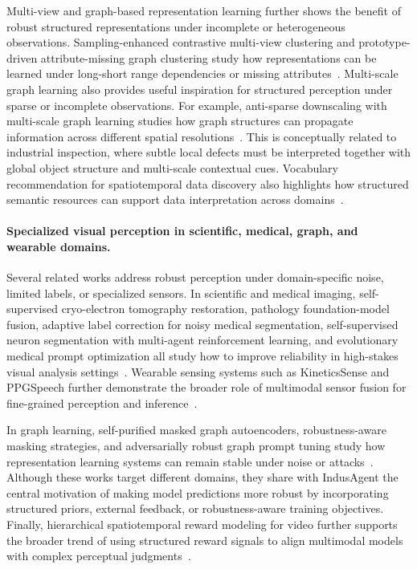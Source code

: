 \documentclass{article}
\begin{document}
{Multi-view and graph-based representation learning further shows the benefit of robust structured representations under incomplete or heterogeneous observations. Sampling-enhanced contrastive multi-view clustering and prototype-driven attribute-missing graph clustering study how representations can be learned under long-short range dependencies or missing attributes~\citep{SEC-LSRM, PAGC}. Multi-scale graph learning also provides useful inspiration for structured perception under sparse or incomplete observations. For example, anti-sparse downscaling with multi-scale graph learning studies how graph structures can propagate information across different spatial resolutions~\citep{fan2025multi}. This is conceptually related to industrial inspection, where subtle local defects must be interpreted together with global object structure and multi-scale contextual cues. Vocabulary recommendation for spatiotemporal data discovery also highlights how structured semantic resources can support data interpretation across domains~\citep{cui2019vocabulary}.

\paragraph{Specialized visual perception in scientific, medical, graph, and wearable domains.}
Several related works address robust perception under domain-specific noise, limited labels, or specialized sensors. In scientific and medical imaging, self-supervised cryo-electron tomography restoration, pathology foundation-model fusion, adaptive label correction for noisy medical segmentation, self-supervised neuron segmentation with multi-agent reinforcement learning, and evolutionary medical prompt optimization all study how to improve reliability in high-stakes visual analysis settings~\citep{Yang_2021_ICCV, yang2025fusionmultiscaleheterogeneouspathology, qian2025adaptive, chen2023self, chen2026empower}. Wearable sensing systems such as KineticsSense and PPGSpeech further demonstrate the broader role of multimodal sensor fusion for fine-grained perception and inference~\citep{10.1145/3749462, 11271667}. 

In graph learning, self-purified masked graph autoencoders, robustness-aware masking strategies, and adversarially robust graph prompt tuning study how representation learning systems can remain stable under noise or attacks~\citep{song2025spmgae, song2025equipping, song2025gpromptshield}. Although these works target different domains, they share with IndusAgent the central motivation of making model predictions more robust by incorporating structured priors, external feedback, or robustness-aware training objectives. Finally, hierarchical spatiotemporal reward modeling for video further supports the broader trend of using structured reward signals to align multimodal models with complex perceptual judgments~\citep{wang2026cac}.
  
}
\end{document}
